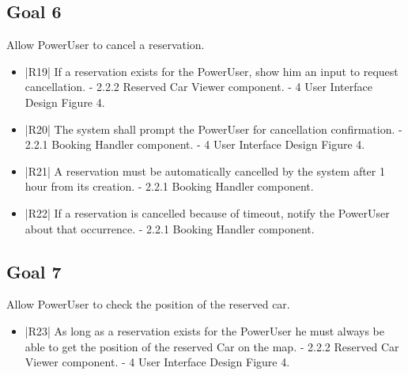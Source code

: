 \subsection {Goal 6} Allow PowerUser to cancel a reservation.
\begin{itemize}
 \item |R19| If a reservation exists for the PowerUser, show him an input to request cancellation.
    \newline - 2.2.2 Reserved Car Viewer component.
    \newline - 4 User Interface Design Figure 4.
 \item |R20| The system shall prompt the PowerUser for cancellation confirmation.
    \newline - 2.2.1 Booking Handler component.
    \newline - 4 User Interface Design Figure 4.
 \item |R21| A reservation must be automatically cancelled by the system after 1 hour from
its creation.
    \newline - 2.2.1 Booking Handler component.
 \item |R22| If a reservation is cancelled because of timeout, notify the PowerUser about
that occurrence.
    \newline - 2.2.1 Booking Handler component.
\end{itemize}

\subsection {Goal 7} Allow PowerUser to check the position of the reserved car.
\begin{itemize}
 \item |R23| As long as a reservation exists for the PowerUser he must always be able to
get the position of the reserved Car on the map.
    \newline - 2.2.2 Reserved Car Viewer component.
    \newline - 4 User Interface Design Figure 4.
\end{itemize}

